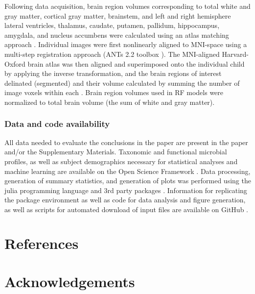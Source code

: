 \documentclass{article}
\begin{document}
Following data acquisition, brain region volumes corresponding to total white and gray matter,
cortical gray matter, brainstem, and left and right hemisphere lateral ventricles,
thalamus, caudate, putamen, pallidum, hippocampus, amygdala,
and nucleus accumbens were calculated using an atlas matching approach \cite{bruchhageLongitudinalBrainCognitive}.
Individual images were first nonlinearly aligned to MNI-space using
a multi-step registration approach (ANTs 2.2 toolbox \cite{avantsInsightToolKitImage2014}).
The MNI-aligned Harvard-Oxford brain atlas was then aligned and superimposed onto the individual child
by applying the inverse transformation, and the brain regions of interest delinated (segmented)
and their volume calculated by summing the number of image voxels within each \cite{jenkinsonFSL2012}.
Brain region volumes used in RF models were normalized to total brain volume
(the sum of white and gray matter).

\subsubsection*{Data and code availability}

All data needed to evaluate the conclusions in the paper
are present in the paper and/or the Supplementary Materials.
Taxonomic and functional microbial profiles, as well as subject
demographics necessary for statistical analyses and machine learning are
available on the Open Science Framework
\cite{bonhamECHORESONANCEMicrobiome2022}.
Data processing, generation of summary statistics, and
generation of plots was performed using the julia programming language
and 3rd party packages
\cite{bezansonJuliaFreshApproach2017,
    bonhamMicrobiomeJlBiobakeryUtils2021,
    danischMakieJlFlexible2021,
    blaomMLJJuliaPackage2020,
    ben_sadeghi_2022_7359268,
    dahua_lin_2023_7695673,
    douglas_bates_2023_7734970}.
Information for replicating the package environment
as well as code for data analysis and figure generation, as well as scripts for automated
download of input files are available on GitHub \cite{kevin_bonham_2023_7647510}.

\section*{References}

\printbibliography[heading=none]

\section*{Acknowledgements}
\end{document}
